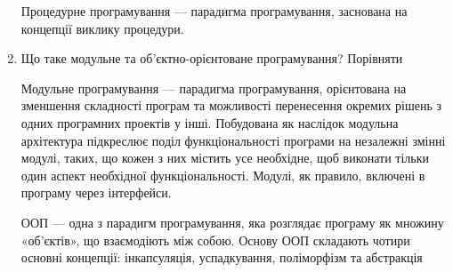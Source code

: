 \documentclass[a4paper, 12pt, oneside]{extarticle}
\begin{document}
\begin{enumerate}
Процедурне програмування --- парадигма програмування, заснована на концепції виклику процедури.

\item Що таке модульне та об’єктно-орієнтоване програмування? Порівняти

Модульне програмування --- парадигма програмування, орієнтована на зменшення складності програм та можливості перенесення окремих рішень з одних програмних проектів у інші. Побудована як наслідок модульна архітектура підкреслює поділ функціональності програми на незалежні змінні модулі, таких, що кожен з них містить усе необхідне, щоб виконати тільки один аспект необхідної функціональності. Модулі, як правило, включені в програму через інтерфейси.

ООП --- одна з парадигм програмування, яка розглядає програму як множину «об'єктів», що взаємодіють між собою. Основу ООП складають чотири основні концепції: інкапсуляція, успадкування, поліморфізм та абстракція
\end{enumerate}
\end{document}
